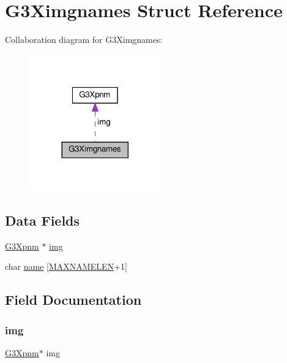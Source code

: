 \hypertarget{struct_g3_ximgnames}{}\section{G3\+Ximgnames Struct Reference}
\label{struct_g3_ximgnames}


Collaboration diagram for G3\+Ximgnames\+:\nopagebreak
\begin{figure}[H]
\begin{center}
\leavevmode
\includegraphics[width=161pt]{struct_g3_ximgnames__coll__graph}
\end{center}
\end{figure}
\subsection*{Data Fields}
\begin{DoxyCompactItemize}
\item 
\hyperlink{struct_g3_xpnm}{G3\+Xpnm} $\ast$ \hyperlink{struct_g3_ximgnames_a3ea0190663b3990ebc8f0be8730998c3}{img}
\item 
char \hyperlink{struct_g3_ximgnames_ac2cd9523d5ab409e403a59e0e21f114a}{name} \mbox{[}\hyperlink{g3x__pnm_8c_a56739a38cf3fb0c5d7d842fe94f96f86}{M\+A\+X\+N\+A\+M\+E\+L\+EN}+1\mbox{]}
\end{DoxyCompactItemize}


\subsection{Field Documentation}
\mbox{\label{struct_g3_ximgnames_a3ea0190663b3990ebc8f0be8730998c3}} 
\subsubsection{\texorpdfstring{img}{img}}
{\footnotesize\ttfamily \hyperlink{struct_g3_xpnm}{G3\+Xpnm}$\ast$ img}

